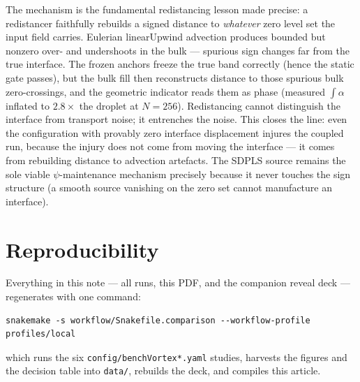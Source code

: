 \documentclass[preprint,3p,11pt]{elsarticle}
\begin{document}
The mechanism is the fundamental redistancing lesson made precise: a redistancer
faithfully rebuilds a signed distance to \emph{whatever} zero level set the
input field carries. Eulerian linearUpwind advection produces bounded but
nonzero over- and undershoots in the bulk --- spurious sign changes far from the
true interface. The frozen anchors freeze the true band correctly (hence the
static gate passes), but the bulk fill then reconstructs distance to those
spurious bulk zero-crossings, and the geometric indicator reads them as phase
(measured $\int\alpha$ inflated to $2.8\times$ the droplet at $N = 256$).
Redistancing cannot distinguish the interface from transport noise; it entrenches
the noise. This closes the line: even the configuration with provably zero
interface displacement injures the coupled run, because the injury does not come
from moving the interface --- it comes from rebuilding distance to advection
artefacts. The SDPLS source remains the sole viable $\psi$-maintenance mechanism
precisely because it never touches the sign structure (a smooth source vanishing
on the zero set cannot manufacture an interface).

\section{Reproducibility}
Everything in this note --- all runs, this PDF, and the companion reveal
deck --- regenerates with one command:
\begin{verbatim}
snakemake -s workflow/Snakefile.comparison --workflow-profile profiles/local
\end{verbatim}
which runs the six \texttt{config/benchVortex*.yaml} studies, harvests the
figures and the decision table into \texttt{data/}, rebuilds the deck, and
compiles this article.
\end{document}
